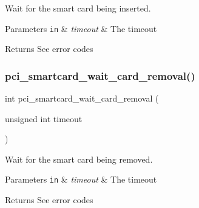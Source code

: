 Wait for the smart card being inserted. 


\begin{DoxyParams}[1]{Parameters}
\mbox{\tt in}  & {\em timeout} & The timeout\\
\hline
\end{DoxyParams}
\begin{DoxyReturn}{Returns}
See error codes 
\end{DoxyReturn}
\hypertarget{group__pcibx__sc_gab0d9d214315edba6757eb7a56508e7fb}{}\label{group__pcibx__sc_gab0d9d214315edba6757eb7a56508e7fb} 
\subsubsection{\texorpdfstring{pci\+\_\+smartcard\+\_\+wait\+\_\+card\+\_\+removal()}{pci\_smartcard\_wait\_card\_removal()}}
{\footnotesize\ttfamily int pci\+\_\+smartcard\+\_\+wait\+\_\+card\+\_\+removal (\begin{DoxyParamCaption}\item[{unsigned int}]{timeout }\end{DoxyParamCaption})}



Wait for the smart card being removed. 


\begin{DoxyParams}[1]{Parameters}
\mbox{\tt in}  & {\em timeout} & The timeout\\
\hline
\end{DoxyParams}
\begin{DoxyReturn}{Returns}
See error codes 
\end{DoxyReturn}
